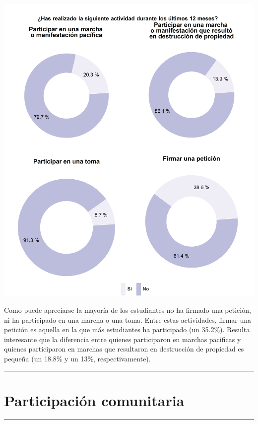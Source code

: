 \documentclass[
  14pt,
]{book}
\let\origfigure\figure
\let\endorigfigure\endfigure
\renewenvironment{figure}[1][2] {
  \expandafter\origfigure\expandafter[H]
} {
  \endorigfigure
}
\begin{document}
\begin{figure}[!ht]

{\centering \includegraphics[width=0.8\linewidth,]{images/graph_partact} 

}

\caption{Participación activista fuera de la escuela}\label{fig:unnamed-chunk-56}
\end{figure}

Como puede apreciarse la mayoría de los estudiantes no ha firmado una petición, ni ha participado en una marcha o una toma. Entre estas actividades, firmar una petición es aquella en la que más estudiantes ha participado (un 35.2\%). Resulta interesante que la diferencia entre quienes participaron en marchas pacificas y quienes participaron en marchas que resultaron en destrucción de propiedad es pequeña (un 18.8\% y un 13\%, respectivamente).

\begin{center}\rule{0.5\linewidth}{0.5pt}\end{center}

\hypertarget{participaciuxf3n-comunitaria}{%
\section{Participación comunitaria}\label{participaciuxf3n-comunitaria}}

\begin{center}\rule{0.5\linewidth}{0.5pt}\end{center}
\end{document}
